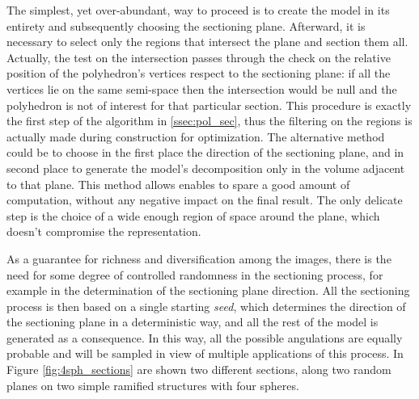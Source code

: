 \begin{figure}[h]
        \label{fig:first_sect}
    \end{figure}

The simplest, yet over-abundant, way to proceed is to create the model in its entirety and subsequently choosing the sectioning plane. Afterward, it is necessary to select only the regions that intersect the plane and section them all. Actually, the test on the intersection passes through the check on the relative position of the polyhedron's vertices respect to the sectioning plane: if all the vertices lie on the same semi-space then the intersection would be null and the polyhedron is not of interest for that particular section. This procedure is exactly the first step of the algorithm in \ref{ssec:pol_sec}, thus the filtering on the regions is actually made during construction for optimization. The alternative method could be to choose in the first place the direction of the sectioning plane, and in second place to generate the model's decomposition only in the volume adjacent to that plane. This method allows enables to spare a good amount of computation, without any negative impact on the final result. The only delicate step is the choice of a wide enough region of space around the plane, which doesn't compromise the representation.

As a guarantee for richness and diversification among the images, there is the need for some degree of controlled randomness in the sectioning process, for example in the determination of the sectioning plane direction. All the sectioning process is then based on a single starting \textit{seed}, which determines the direction of the sectioning plane in a deterministic way, and all the rest of the model is generated as a consequence. In this way, all the possible angulations are equally probable and will be sampled in view of multiple applications of this process. In Figure \ref{fig:4sph_sections} are shown two different sections, along two random planes on two simple ramified structures with four spheres.


